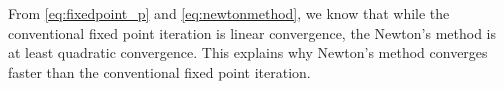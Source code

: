 From \eqref{eq:fixedpoint_p} and \eqref{eq:newtonmethod}, we know that while the conventional fixed point iteration is linear convergence, the Newton's method is at least quadratic convergence. This explains why Newton's method converges faster than the conventional fixed point iteration.

























